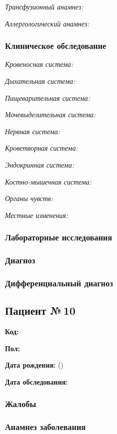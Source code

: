 \documentclass[a4paper,14pt]{extarticle}
\begin{document}
\emph{Трансфузионный анамнез:}

\emph{Аллергологический анамнез:}

\subsubsection*{Клиническое обследование}

\emph{Кровеносная система:}

\emph{Дыхательная система:}

\emph{Пищеварительная система:}

\emph{Мочевыделительная система:}

\emph{Нервная система:} 

\emph{Кроветворная система:}

\emph{Эндокринная система:}

\emph{Костно-мышечная система:}

\emph{Органы чувств:}

\emph{Местные изменения:}

\subsubsection*{Лабораторные исследования}

\subsubsection*{Диагноз}

\subsubsection*{Дифференциальный диагноз}

\newpage
\subsection*{Пациент №\,10}

\textbf{Код:} 

\textbf{Пол:}

\textbf{Дата рождения:}  ()

\textbf{Дата обследования:} 

\subsubsection*{Жалобы}

\subsubsection*{Анамнез заболевания}
\end{document}
